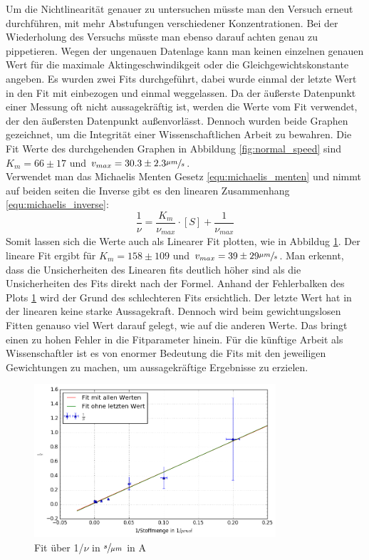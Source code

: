Um die Nichtlinearität genauer zu untersuchen müsste man den Versuch erneut durchführen, 
mit mehr Abstufungen verschiedener Konzentrationen.
Bei der Wiederholung des Versuchs müsste man ebenso darauf achten genau zu pippetieren.
Wegen der ungenauen Datenlage kann man keinen einzelnen genauen Wert für die maximale
Aktingeschwindikgeit oder die Gleichgewichtskonstante angeben.
Es wurden zwei Fits durchgeführt, dabei wurde einmal der letzte Wert in den Fit mit einbezogen und einmal weggelassen. Da der äußerste Datenpunkt einer Messung oft nicht aussagekräftig ist,
werden die Werte vom Fit verwendet, der den äußersten Datenpunkt außenvorlässt.
Dennoch wurden beide Graphen gezeichnet, um die Integrität einer Wissenschaftlichen Arbeit zu bewahren.
Die Fit Werte des durchgehenden Graphen in Abbildung \ref{fig:normal_speed} sind $K_m = 66 \pm 17$ und $v_{max} = 30.3 \pm 2.3 \sfrac{\mu m}{s}$.\\ 
Verwendet man das Michaelis Menten Gesetz \ref{equ:michaelis_menten} und nimmt auf beiden seiten die Inverse gibt es den linearen Zusammenhang \ref{equ:michaelis_inverse}:
\begin{equation}
  \frac{1}{\nu} = \frac{K_m}{\nu_{max}} \cdot [S] + \frac{1}{\nu_{max}}
  \label{equ:michaelis_inverse}
\end{equation}
Somit lassen sich die Werte auch als Linearer Fit plotten, wie in Abbildug \ref{fig:1_over_speed}.
Der lineare Fit ergibt für $K_m = 158 \pm 109$ und $v_{max} = 39 \pm 29 \sfrac{\mu m}{s}$.
Man erkennt, dass die Unsicherheiten des Linearen fits
deutlich höher sind als die Unsicherheiten des Fits direkt nach der Formel.
Anhand der Fehlerbalken des Plots \ref{fig:1_over_speed} wird der Grund des schlechteren Fits ersichtlich. Der letzte Wert hat in der linearen keine starke Aussagekraft. Dennoch wird beim gewichtungslosen Fitten genauso viel Wert darauf gelegt, wie auf die anderen Werte.
Das bringt einen zu hohen Fehler in die Fitparameter hinein.
Für die künftige Arbeit als Wissenschaftler ist es von enormer Bedeutung die Fits mit den jeweiligen
Gewichtungen zu machen, um aussagekräftige Ergebnisse zu erzielen.
\begin{figure}[]
  \centering
  \includegraphics[width=0.8\textwidth]{bilder/both_fits_1over.png}
  \caption{Fit über 1/$\nu$  in $\sfrac{s}{\mu m}$ in A}
  \label{fig:1_over_speed}
\end{figure}

